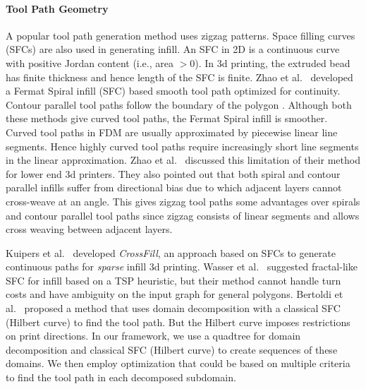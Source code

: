   \paragraph{Tool Path Geometry}\label{sec:extruderpath}
  A popular tool path generation method uses zigzag patterns. 
  Space filling curves (SFCs) are also used in generating infill.
  An SFC in 2D is a continuous curve with positive Jordan content (i.e., area $>0$). 
  In 3d printing, the extruded bead has finite thickness and hence length of the SFC is finite. 
  Zhao et al.~\cite{ZhGuHuGaYoChBeZhCoDaBa2016} developed a Fermat Spiral infill (SFC) based smooth tool path optimized for continuity. 
  Contour parallel tool paths follow the boundary of the polygon \cite{YaLoFuWa2002}.
  Although both these methods give curved tool paths, the Fermat Spiral infill \cite{ZhGuHuGaYoChBeZhCoDaBa2016} is smoother.
  Curved tool paths in FDM are usually approximated by piecewise linear line segments.
  Hence highly curved tool paths require increasingly short line segments in the linear approximation.
  Zhao et al.~\cite{ZhGuHuGaYoChBeZhCoDaBa2016} discussed this limitation of their method for lower end 3d printers.
  They also pointed out that both spiral and contour parallel infills suffer from directional bias due to which adjacent layers cannot cross-weave at an angle.
  This gives zigzag tool paths some advantages over spirals and contour parallel tool paths since zigzag consists of linear segments and allows cross weaving between adjacent layers.

  Kuipers et al.~\cite{KuWuWa2019} developed \emph{CrossFill}, an approach based on SFCs to generate continuous paths for \emph{sparse} infill 3d printing.  
  Wasser et al.~\cite{WaJaPi1999} suggested fractal-like SFC for infill based on a TSP heuristic, but their method cannot handle turn costs and have ambiguity on the input graph for general polygons.
  Bertoldi et al.~\cite{BeYaPiGu1998} proposed a method that uses domain decomposition with a classical SFC (Hilbert curve) to find the tool path.
  But the Hilbert curve imposes restrictions on print directions.
  In our framework, we use a quadtree for domain decomposition and classical SFC (Hilbert curve) to create sequences of these domains.
  We then employ optimization that could be based on multiple criteria to find the tool path in each decomposed subdomain. 

